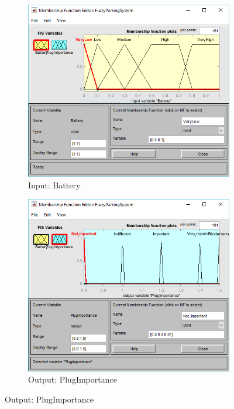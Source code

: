\begin{figure}
	\begin{subfigure}{.5\textwidth}
		\includegraphics[width=1\textwidth]{img/Fuzzy/Battery.PNG}
		\caption{Input: Battery}
		\label{fig:subim1}
	\end{subfigure}
	\begin{subfigure}{.5\textwidth}
		\includegraphics[width=1\textwidth]{img/Fuzzy/PlugImportance.PNG}
		\caption{Output: PlugImportance}
		\label{fig:subim2}
	\end{subfigure}

\end{figure}
